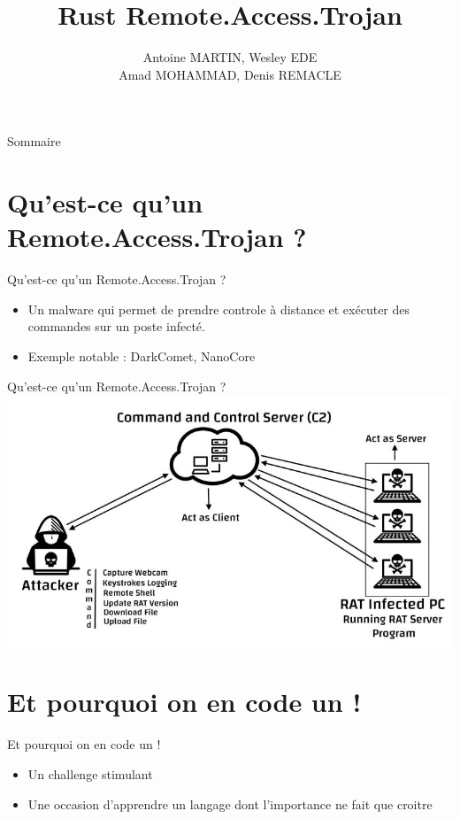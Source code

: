 \documentclass{beamer}
\title{Rust Remote.Access.Trojan}
\author{Antoine MARTIN, Wesley EDE\\Amad MOHAMMAD, Denis REMACLE}
\begin{document}
  \begin{frame}
 \maketitle
  \end{frame}

\begin{frame}{Sommaire}
    \tableofcontents
\end{frame}

\section{Qu'est-ce qu'un Remote.Access.Trojan ?}
  \begin{frame}{Qu'est-ce qu'un Remote.Access.Trojan ?}
  \begin{itemize}
	\item Un malware qui permet de prendre controle à distance et exécuter des commandes sur un poste infecté.
	\item Exemple notable : DarkComet, NanoCore
  \end{itemize}
  \end{frame}

  \begin{frame}{Qu'est-ce qu'un Remote.Access.Trojan ?}
\includegraphics[scale=.4]{Schema.jpg}
  \end{frame}

\section{Et pourquoi on en code un !}
  \begin{frame}{Et pourquoi on en code un !}
  \begin{itemize}
	\item Un challenge stimulant
	\item Une occasion d'apprendre un langage dont l'importance ne fait que croitre
  \end{itemize}
  \end{frame}
\end{document}
